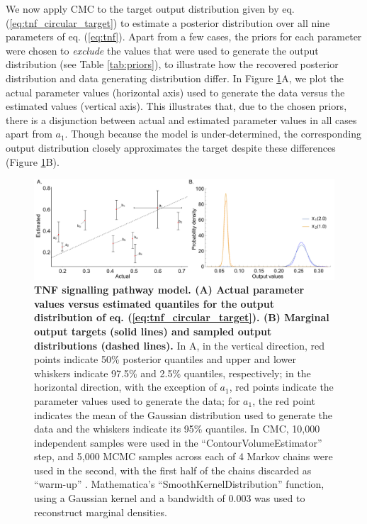 We now apply CMC to the target output distribution given by eq. (\ref{eq:tnf_circular_target}) to estimate a posterior distribution over all nine parameters of eq. (\ref{eq:tnf}). Apart from a few cases, the priors for each parameter were chosen to \emph{exclude} the values that were used to generate the output distribution (see Table \ref{tab:priors}), to illustrate how the recovered posterior distribution and data generating distribution differ. In Figure \ref{fig:tnf_circular_versus}A, we plot the actual parameter values (horizontal axis) used to generate the data versus the estimated values (vertical axis). This illustrates that, due to the chosen priors, there is a disjunction between actual and estimated parameter values in all cases apart from $a_1$. Though because the model is under-determined, the corresponding output distribution closely approximates the target despite these differences (Figure \ref{fig:tnf_circular_versus}B).


\begin{figure}[H]
\centerline{\includegraphics[width=1.0\textwidth]{../figures/tnf_circular_both.pdf}}
\caption{\textbf{TNF signalling pathway model. (A) Actual parameter values versus estimated quantiles for the output distribution of eq. (\ref{eq:tnf_circular_target}). (B) Marginal output targets (solid lines) and sampled output distributions (dashed lines).} In A, in the vertical direction, red points indicate 50\% posterior quantiles and upper and lower whiskers indicate 97.5\% and 2.5\% quantiles, respectively; in the horizontal direction, with the exception of $a_1$, red points indicate the parameter values used to generate the data; for $a_1$, the red point indicates the mean of the Gaussian distribution used to generate the data and the whiskers indicate its 95\% quantiles. In CMC, 10,000 independent samples were used in the ``ContourVolumeEstimator'' step, and 5,000 MCMC samples across each of 4 Markov chains were used in the second, with the first half of the chains discarded as ``warm-up'' \cite{lambert2018Student}. Mathematica's ``SmoothKernelDistribution'' function, using a Gaussian kernel \cite{mathematica} and a bandwidth of 0.003 was used to reconstruct marginal densities.}
	\label{fig:tnf_circular_versus}
\end{figure}

